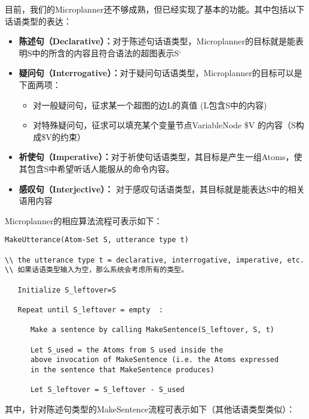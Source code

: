 目前，我们的Microplanner还不够成熟，但已经实现了基本的功能。其中包括以下话语类型的表达：

\begin{itemize}

\item {\bf 陈述句（Declarative）：}对于陈述句话语类型，Microplanner的目标就是能表明S中的所含的内容且符合语法的超图表示S‘
\item  {\bf 疑问句（Interrogative）：}对于疑问句话语类型，Microplanner的目标可以是下面两项：
\begin{itemize}
\item 对一般疑问句，征求某一个超图的边L的真值 (L包含S中的内容)
\item 对特殊疑问句，征求可以填充某个变量节点VariableNode \$V 的内容（S构成\$V的约束）
\end{itemize}
\item {\bf 祈使句（Imperative）：}对于祈使句话语类型，其目标是产生一组Atoms，使其包含S中希望听话人能服从的命令内容。
\item {\bf 感叹句（Interjective）：} 对于感叹句话语类型，其目标就是能表达S中的相关语用内容
\end{itemize}

Microplanner的相应算法流程可表示如下：

\begin{verbatim}
MakeUtterance(Atom-Set S, utterance type t)

\\ the utterance type t = declarative, interrogative, imperative, etc.
\\ 如果话语类型输入为空，那么系统会考虑所有的类型。

   Initialize S_leftover=S

   Repeat until S_leftover = empty  :

      Make a sentence by calling MakeSentence(S_leftover, S, t)

      Let S_used = the Atoms from S used inside the
      above invocation of MakeSentence (i.e. the Atoms expressed
      in the sentence that MakeSentence produces)

      Let S_leftover = S_leftover - S_used

\end{verbatim}

其中，针对陈述句类型的MakeSentence流程可表示如下（其他话语类型类似）：

